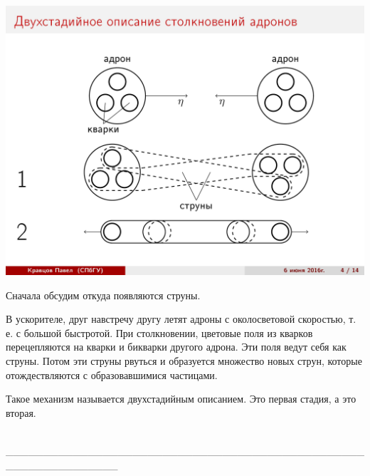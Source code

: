 \documentclass[14pt]{article}
\renewcommand{\line}{\\ \_\_\_\_\_\_\_\_\_\_\_\_\_\_\_\_\_\_\_\_\_\_\_\_\_\_\_\_\_\_\_\_\_\_\_\_\_\_\_\_\_\_\_\_\_\_\_\_\_\_\_\_\_\_\_\_\_\_\_\_\_\_\_ \\ }
\begin{document}
\begin{minipage}[h]{0.5\linewidth}
\includegraphics[width=1\linewidth]{page-04.jpg}
\end{minipage}
\begin{minipage}[h]{0.45\linewidth}
Сначала обсудим откуда появляются струны.

В ускорителе, друг навстречу другу летят адроны с околосветовой скоростью, т. е. с большой быстротой. При столкновении, цветовые поля из кварков перецепляются на кварки и бикварки другого адрона. Эти поля ведут себя как струны. Потом эти струны рвуться и образуется множество новых струн, которые отождествляются с образовавшимися частицами.

Такое механизм называется двухстадийным описанием. Это первая стадия, а это вторая.
\end{minipage}
\line
\end{document}
